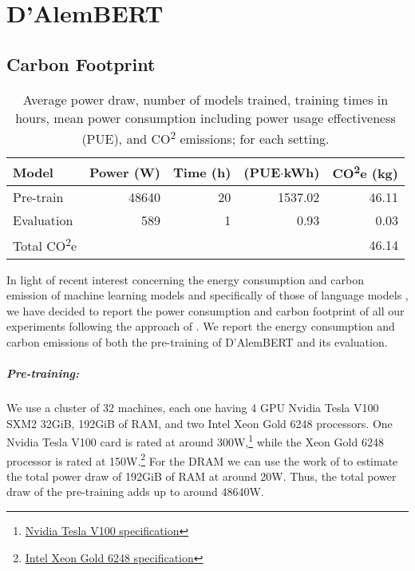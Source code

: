 \chapter{D'AlemBERT}

\section{Carbon Footprint}\label{carbon-footprint-dalembert}

\begin{table}[th]
    \centering\small
        \begin{tabular}{lrrrr}
            \toprule
            \textbf{Model}               & {\textbf{Power (W)}} & {\textbf{Time (h)}} & {\textbf{(PUE$\cdotp$kWh)}} & {\textbf{CO\textsuperscript{2}e (kg)}} \\
            \midrule
            Pre-train                    & 48640                & 20                  & 1537.02                     & 46.11                                  \\
            Evaluation                   & 589                  & 1                   & 0.93                        & 0.03                                   \\
            \midrule
            Total CO\textsuperscript{2}e &                      &                     &                             & 46.14                                  \\
            \bottomrule
        \end{tabular}
    \caption{Average power draw, number of models trained, training times in hours, mean power consumption including power usage effectiveness (PUE), and CO\textsuperscript{2} emissions; for each setting.}
    \label{tab:carbon-dalembert}
\end{table}

In light of recent interest concerning the energy consumption and carbon emission of machine learning models and specifically of those of language models \cite{schwartz-etal-2020-green,bender-etal-2021-on}, we have decided to report the power consumption and carbon footprint of all our experiments following the approach of . We report the energy consumption and carbon emissions of both the pre-training of D'AlemBERT and its evaluation.

\paragraph{Pre-training:} We use a cluster of 32 machines, each one having 4 GPU Nvidia Tesla V100 SXM2 32GiB, 192GiB of RAM, and two Intel Xeon Gold 6248 processors. One Nvidia Tesla V100 card is rated at around 300W,\footnote{\href{https://www.nvidia.com/en-us/data-center/v100/}{ Nvidia Tesla V100 specification}} while the Xeon Gold 6248 processor is rated at 150W.\footnote{\href{https://ark.intel.com/content/www/us/en/ark/products/192446/intel-xeon-gold-6248-processor-27-5m-cache-2-50-ghz.html}{Intel Xeon Gold 6248 specification}} For the DRAM we can use the work of  to estimate the total power draw of 192GiB of RAM at around 20W. Thus, the total power draw of the pre-training adds up to around 48640W.

